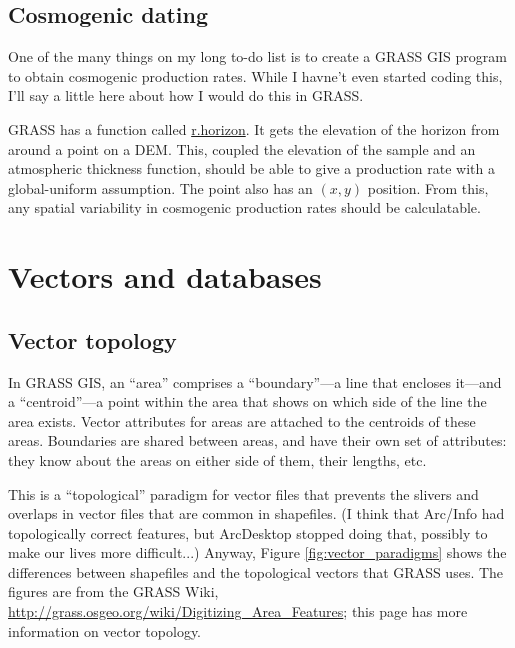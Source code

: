 \documentclass{book}
\begin{document}
\section{Cosmogenic dating}

One of the many things on my long to-do list is to create a GRASS GIS program to obtain cosmogenic production rates. While I havne't even started coding this, I'll say a little here about how I would do this in GRASS.

GRASS has a function called \url{r.horizon}. It gets the elevation of the horizon from around a point on a DEM. This, coupled the elevation of the sample and an atmospheric thickness function, should be able to give a production rate with a global-uniform assumption. The point also has an $(x,y)$ position. From this, any spatial variability in cosmogenic production rates should be calculatable.

\chapter{Vectors and databases \label{s:vector}}

\section{Vector topology}

In GRASS GIS, an ``area'' comprises a ``boundary''---a line that encloses it---and a ``centroid''---a point within the area that shows on which side of the line the area exists. Vector attributes for areas are attached to the centroids of these areas. Boundaries are shared between areas, and have their own set of attributes: they know about the areas on either side of them, their lengths, etc.

This is a ``topological'' paradigm for vector files that prevents the slivers and overlaps in vector files that are common in shapefiles. (I think that Arc/Info had topologically correct features, but ArcDesktop stopped doing that, possibly to make our lives more difficult...) Anyway, Figure \ref{fig:vector_paradigms} shows the differences between shapefiles and the topological vectors that GRASS uses. The figures are from the GRASS Wiki, \url{http://grass.osgeo.org/wiki/Digitizing_Area_Features}; this page has more information on vector topology.
\end{document}
